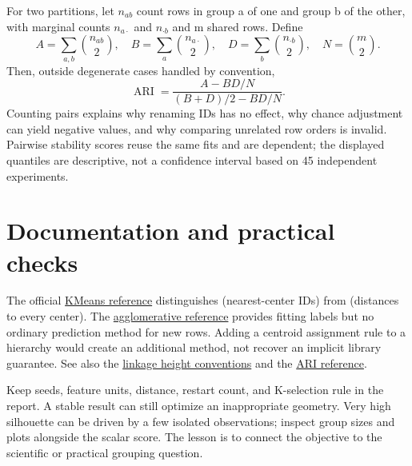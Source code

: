 For two partitions, let $n_{ab}$ count rows in group a of one and group b of the other,
with marginal counts $n_{a\cdot}$ and $n_{\cdot b}$ and m shared rows. Define
\[
A=\sum_{a,b}\binom{n_{ab}}2,\quad B=\sum_a\binom{n_{a\cdot}}2,\quad
D=\sum_b\binom{n_{\cdot b}}2,\quad N=\binom m2.
\]
Then, outside degenerate cases handled by convention,
\[\operatorname{ARI}=\frac{A-BD/N}{(B+D)/2-BD/N}.\]
Counting pairs explains why renaming IDs has no effect, why chance adjustment can yield negative values,
and why comparing unrelated row orders is invalid. Pairwise stability scores reuse the same fits and are dependent;
the displayed quantiles are descriptive, not a confidence interval based on 45 independent experiments.

\section*{Documentation and practical checks}
The official \href{https://scikit-learn.org/1.8/modules/generated/sklearn.cluster.KMeans.html}{KMeans reference}
distinguishes  (nearest-center IDs) from  (distances to every center).
The \href{https://scikit-learn.org/1.8/modules/generated/sklearn.cluster.AgglomerativeClustering.html}{agglomerative reference}
provides fitting labels but no ordinary prediction method for new rows. Adding a centroid assignment rule to a hierarchy
would create an additional method, not recover an implicit library guarantee.
See also the \href{https://docs.scipy.org/doc/scipy/reference/generated/scipy.cluster.hierarchy.linkage.html}{linkage height conventions}
and the \href{https://scikit-learn.org/1.8/modules/generated/sklearn.metrics.adjusted_rand_score.html}{ARI reference}.

Keep seeds, feature units, distance, restart count, and K-selection rule in the report.
A stable result can still optimize an inappropriate geometry. Very high silhouette can be driven by a few isolated observations;
inspect group sizes and plots alongside the scalar score. The lesson is to connect the objective to the scientific or practical grouping question.

